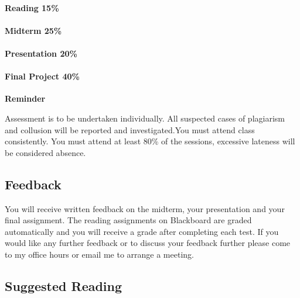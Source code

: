 \documentclass[
]{article}
\begin{document}
\hypertarget{reading-15}{%
\paragraph{Reading 15\%}\label{reading-15}}

\hypertarget{midterm-25}{%
\paragraph{Midterm 25\%}\label{midterm-25}}

\hypertarget{presentation-20}{%
\paragraph{Presentation 20\%}\label{presentation-20}}

\hypertarget{final-project-40}{%
\paragraph{Final Project 40\%}\label{final-project-40}}

\begin{yellowbox}

\begin{center}

\textbf{Reminder}

\end{center}

Assessment is to be undertaken individually. All suspected cases of
plagiarism and collusion will be reported and investigated.You must
attend class consistently. You must attend at least 80\% of the
sessions, excessive lateness will be considered absence.

\end{yellowbox}

\hypertarget{feedback}{%
\subsection{Feedback}\label{feedback}}

You will receive written feedback on the midterm, your presentation and
your final assignment. The reading assignments on Blackboard are graded
automatically and you will receive a grade after completing each test.
If you would like any further feedback or to discuss your feedback
further please come to my office hours or email me to arrange a meeting.

\hypertarget{suggested-reading}{%
\subsection{Suggested Reading}\label{suggested-reading}}
\end{document}
